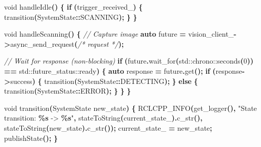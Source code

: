 \documentclass[
]{article}
\newenvironment{Shaded}{\begin{snugshade}}{\end{snugshade}}
\newcommand{\BuiltInTok}[1]{#1}
\newcommand{\CommentTok}[1]{\textcolor[rgb]{0.56,0.35,0.01}{\textit{#1}}}
\newcommand{\ControlFlowTok}[1]{\textcolor[rgb]{0.13,0.29,0.53}{\textbf{#1}}}
\newcommand{\DataTypeTok}[1]{\textcolor[rgb]{0.13,0.29,0.53}{#1}}
\newcommand{\DecValTok}[1]{\textcolor[rgb]{0.00,0.00,0.81}{#1}}
\newcommand{\KeywordTok}[1]{\textcolor[rgb]{0.13,0.29,0.53}{\textbf{#1}}}
\newcommand{\NormalTok}[1]{#1}
\newcommand{\OperatorTok}[1]{\textcolor[rgb]{0.81,0.36,0.00}{\textbf{#1}}}
\newcommand{\SpecialCharTok}[1]{\textcolor[rgb]{0.81,0.36,0.00}{\textbf{#1}}}
\newcommand{\StringTok}[1]{\textcolor[rgb]{0.31,0.60,0.02}{#1}}
\newcommand{\VariableTok}[1]{\textcolor[rgb]{0.00,0.00,0.00}{#1}}
\begin{document}
\begin{Shaded}
\begin{Highlighting}[]
    \DataTypeTok{void}\NormalTok{ handleIdle}\OperatorTok{()} \OperatorTok{\{}
        \ControlFlowTok{if} \OperatorTok{(}\VariableTok{trigger\_received\_}\OperatorTok{)} \OperatorTok{\{}
\NormalTok{            transition}\OperatorTok{(}\NormalTok{SystemState}\OperatorTok{::}\NormalTok{SCANNING}\OperatorTok{);}
        \OperatorTok{\}}
    \OperatorTok{\}}

    \DataTypeTok{void}\NormalTok{ handleScanning}\OperatorTok{()} \OperatorTok{\{}
        \CommentTok{// Capture image}
        \KeywordTok{auto}\NormalTok{ future }\OperatorTok{=} \VariableTok{vision\_client\_}\OperatorTok{{-}\textgreater{}}\NormalTok{async\_send\_request}\OperatorTok{(}\CommentTok{/* request */}\OperatorTok{);}

        \CommentTok{// Wait for response (non{-}blocking)}
        \ControlFlowTok{if} \OperatorTok{(}\NormalTok{future}\OperatorTok{.}\NormalTok{wait\_for}\OperatorTok{(}\BuiltInTok{std::}\NormalTok{chrono::seconds}\OperatorTok{(}\DecValTok{0}\OperatorTok{))} \OperatorTok{==} \BuiltInTok{std::}\NormalTok{future\_status::ready}\OperatorTok{)} \OperatorTok{\{}
            \KeywordTok{auto}\NormalTok{ response }\OperatorTok{=}\NormalTok{ future}\OperatorTok{.}\NormalTok{get}\OperatorTok{();}
            \ControlFlowTok{if} \OperatorTok{(}\NormalTok{response}\OperatorTok{{-}\textgreater{}}\NormalTok{success}\OperatorTok{)} \OperatorTok{\{}
\NormalTok{                transition}\OperatorTok{(}\NormalTok{SystemState}\OperatorTok{::}\NormalTok{DETECTING}\OperatorTok{);}
            \OperatorTok{\}} \ControlFlowTok{else} \OperatorTok{\{}
\NormalTok{                transition}\OperatorTok{(}\NormalTok{SystemState}\OperatorTok{::}\NormalTok{ERROR}\OperatorTok{);}
            \OperatorTok{\}}
        \OperatorTok{\}}
    \OperatorTok{\}}

    \DataTypeTok{void}\NormalTok{ transition}\OperatorTok{(}\NormalTok{SystemState new\_state}\OperatorTok{)} \OperatorTok{\{}
\NormalTok{        RCLCPP\_INFO}\OperatorTok{(}\NormalTok{get\_logger}\OperatorTok{(),} \StringTok{"State transition: }\SpecialCharTok{\%s}\StringTok{ {-}\textgreater{} }\SpecialCharTok{\%s}\StringTok{"}\OperatorTok{,}
\NormalTok{                    stateToString}\OperatorTok{(}\VariableTok{current\_state\_}\OperatorTok{).}\NormalTok{c\_str}\OperatorTok{(),}
\NormalTok{                    stateToString}\OperatorTok{(}\NormalTok{new\_state}\OperatorTok{).}\NormalTok{c\_str}\OperatorTok{());}
        \VariableTok{current\_state\_} \OperatorTok{=}\NormalTok{ new\_state}\OperatorTok{;}
\NormalTok{        publishState}\OperatorTok{();}
    \OperatorTok{\}}


\end{Highlighting}
\end{Shaded}
\end{document}
